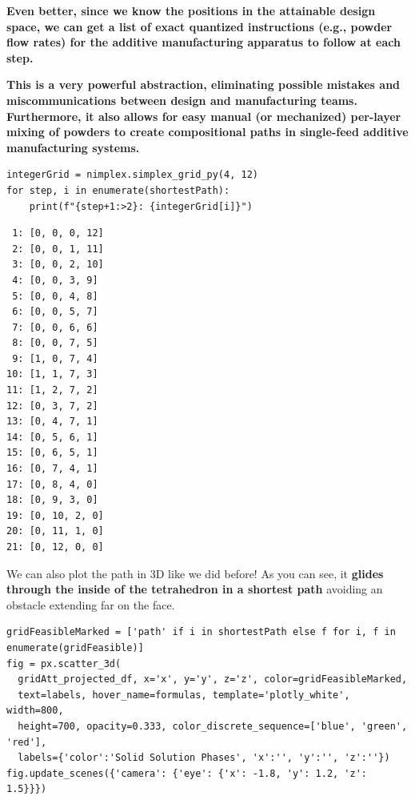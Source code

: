 \textbf{Even better, since we know the positions in the attainable
design space, we can get a list of exact quantized instructions (e.g.,
powder flow rates) for the additive manufacturing apparatus to follow at
each step.}

\textbf{This is a very powerful abstraction, eliminating possible
mistakes and miscommunications between design and manufacturing teams.
Furthermore, it also allows for easy manual (or mechanized) per-layer
mixing of powders to create compositional paths in single-feed additive
manufacturing systems.}

\begin{verbatim}
integerGrid = nimplex.simplex_grid_py(4, 12)
for step, i in enumerate(shortestPath):
    print(f"{step+1:>2}: {integerGrid[i]}")
\end{verbatim}

\begin{verbatim}
 1: [0, 0, 0, 12]
 2: [0, 0, 1, 11]
 3: [0, 0, 2, 10]
 4: [0, 0, 3, 9]
 5: [0, 0, 4, 8]
 6: [0, 0, 5, 7]
 7: [0, 0, 6, 6]
 8: [0, 0, 7, 5]
 9: [1, 0, 7, 4]
10: [1, 1, 7, 3]
11: [1, 2, 7, 2]
12: [0, 3, 7, 2]
13: [0, 4, 7, 1]
14: [0, 5, 6, 1]
15: [0, 6, 5, 1]
16: [0, 7, 4, 1]
17: [0, 8, 4, 0]
18: [0, 9, 3, 0]
19: [0, 10, 2, 0]
20: [0, 11, 1, 0]
21: [0, 12, 0, 0]
\end{verbatim}

We can also plot the path in 3D like we did before! As you can see, it
\textbf{glides through the inside of the tetrahedron in a shortest path}
avoiding an obstacle extending far on the face.

\begin{verbatim}
gridFeasibleMarked = ['path' if i in shortestPath else f for i, f in enumerate(gridFeasible)]
fig = px.scatter_3d(
  gridAtt_projected_df, x='x', y='y', z='z', color=gridFeasibleMarked, 
  text=labels, hover_name=formulas, template='plotly_white', width=800, 
  height=700, opacity=0.333, color_discrete_sequence=['blue', 'green', 'red'],
  labels={'color':'Solid Solution Phases', 'x':'', 'y':'', 'z':''})
fig.update_scenes({'camera': {'eye': {'x': -1.8, 'y': 1.2, 'z': 1.5}}})
\end{verbatim}

